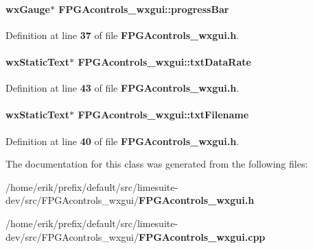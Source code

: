 \paragraph[{progress\+Bar}]{\setlength{\rightskip}{0pt plus 5cm}wx\+Gauge$\ast$ F\+P\+G\+Acontrols\+\_\+wxgui\+::progress\+Bar}\label{classFPGAcontrols__wxgui_a1d21c562c35d049f96b55db1b5135de2}


Definition at line {\bf 37} of file {\bf F\+P\+G\+Acontrols\+\_\+wxgui.\+h}.

\paragraph[{txt\+Data\+Rate}]{\setlength{\rightskip}{0pt plus 5cm}wx\+Static\+Text$\ast$ F\+P\+G\+Acontrols\+\_\+wxgui\+::txt\+Data\+Rate}\label{classFPGAcontrols__wxgui_ac879000517e5bdaf27a0f04d123a9b47}


Definition at line {\bf 43} of file {\bf F\+P\+G\+Acontrols\+\_\+wxgui.\+h}.

\paragraph[{txt\+Filename}]{\setlength{\rightskip}{0pt plus 5cm}wx\+Static\+Text$\ast$ F\+P\+G\+Acontrols\+\_\+wxgui\+::txt\+Filename}\label{classFPGAcontrols__wxgui_a49dbdccb027028e97604e0e67ec01ce4}


Definition at line {\bf 40} of file {\bf F\+P\+G\+Acontrols\+\_\+wxgui.\+h}.



The documentation for this class was generated from the following files\+:\begin{DoxyCompactItemize}
\item 
/home/erik/prefix/default/src/limesuite-\/dev/src/\+F\+P\+G\+Acontrols\+\_\+wxgui/{\bf F\+P\+G\+Acontrols\+\_\+wxgui.\+h}\item 
/home/erik/prefix/default/src/limesuite-\/dev/src/\+F\+P\+G\+Acontrols\+\_\+wxgui/{\bf F\+P\+G\+Acontrols\+\_\+wxgui.\+cpp}\end{DoxyCompactItemize}
